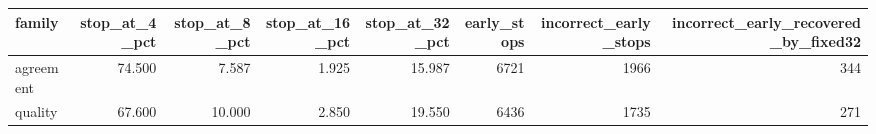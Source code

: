 \begin{tabular}{lrrrrrrr}
\toprule
family & stop\_at\_4\_pct & stop\_at\_8\_pct & stop\_at\_16\_pct & stop\_at\_32\_pct & early\_stops & incorrect\_early\_stops & incorrect\_early\_recovered\_by\_fixed32 \\
\midrule
agreement & 74.500 & 7.587 & 1.925 & 15.987 & 6721 & 1966 & 344 \\
quality & 67.600 & 10.000 & 2.850 & 19.550 & 6436 & 1735 & 271 \\
\bottomrule
\end{tabular}
